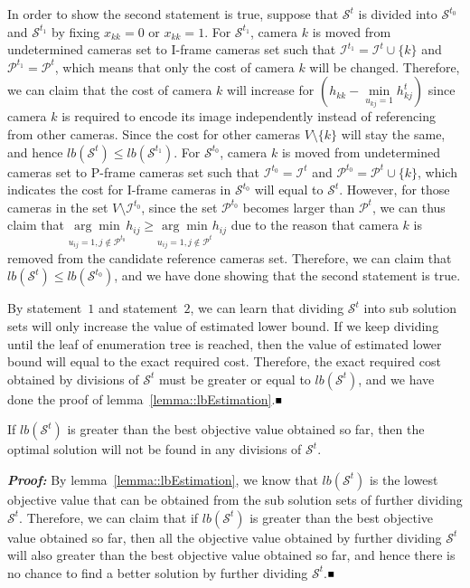 In order to show the second statement is true, suppose that $\mathcal{S}^t$ is divided into $\mathcal{S}^{t_0}$ and $\mathcal{S}^{t_1}$ by fixing $x_{kk}=0$ or $x_{kk}=1$.
For $\mathcal{S}^{t_1}$, camera $k$ is moved from undetermined cameras set to I-frame cameras set such that $\mathcal{I}^{t_1} = \mathcal{I}^t \cup \{k\}$ and $\mathcal{P}^{t_1} = \mathcal{P}^t$, which means that only the cost of camera $k$ will be changed.
Therefore, we can claim that the cost of camera $k$ will increase for $\left( h_{kk} - \underset{u_{kj}=1}{\min} h_{kj}^t \right)$ since camera $k$ is required to encode its image independently instead of referencing from other cameras.
Since the cost for other cameras $V\setminus \{k\}$ will stay the same, and hence $lb(\mathcal{S}^t) \leq lb(\mathcal{S}^{t_1})$.
For $\mathcal{S}^{t_0}$, camera $k$ is moved from undetermined cameras set to P-frame cameras set such that $\mathcal{I}^{t_0} = \mathcal{I}^t$ and $\mathcal{P}^{t_0} = \mathcal{P}^t \cup \{k\}$, which indicates the cost for I-frame cameras in $\mathcal{S}^{t_0}$ will equal to $\mathcal{S}^t$.
However, for those cameras in the set $V \setminus \mathcal{I}^{t_0}$, since the set $\mathcal{P}^{t_0}$ becomes larger than $\mathcal{P}^t$, we can thus claim that $\underset{u_{ij}=1, j \notin \mathcal{P}^{t_0}}{\arg\min} h_{ij} \geq \underset{u_{ij}=1, j \notin \mathcal{P}^{t}}{\arg\min} h_{ij}$ due to the reason that camera $k$ is removed from the candidate reference cameras set.
Therefore, we can claim that $lb(\mathcal{S}^t) \leq lb(\mathcal{S}^{t_0})$, and we have done showing that the second statement is true.

By statement~$1$ and statement~$2$, we can learn that dividing $\mathcal{S}^t$ into sub solution sets will only increase the value of estimated lower bound.
If we keep dividing until the leaf of enumeration tree is reached, then the value of estimated lower bound will equal to the exact required cost.
Therefore, the exact required cost obtained by divisions of $\mathcal{S}^t$ must be greater or equal to $lb(\mathcal{S}^t)$, and we have done the proof of lemma~\ref{lemma::lbEstimation}.\hfill$\mathsmaller{\mathsmaller{\blacksquare}}$

\begin{mythm}
If $lb(\mathcal{S}^t)$ is greater than the best objective value obtained so far, then the optimal solution will not be found in any divisions of $\mathcal{S}^t$.
\label{theorem::bound}
\end{mythm}
\textbf{\emph{Proof:}}
By lemma~\ref{lemma::lbEstimation}, we know that $lb(\mathcal{S}^t)$ is the lowest objective value that can be obtained from the sub solution sets of further dividing $\mathcal{S}^t$.
Therefore, we can claim that if $lb(\mathcal{S}^t)$ is greater than the best objective value obtained so far, then all the objective value obtained by further dividing $\mathcal{S}^t$ will also greater than the best objective value obtained so far, and hence there is no chance to find a better solution by further dividing $\mathcal{S}^t$.\hfill$\mathsmaller{\mathsmaller{\blacksquare}}$

